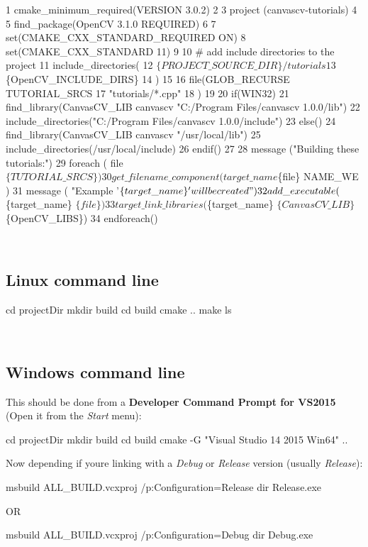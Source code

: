 \begin{DoxyCode}
1 cmake\_minimum\_required(VERSION 3.0.2)
2 
3 project (canvascv-tutorials)
4 
5 find\_package(OpenCV 3.1.0 REQUIRED)
6 
7 set(CMAKE\_CXX\_STANDARD\_REQUIRED ON)
8 set(CMAKE\_CXX\_STANDARD 11)
9 
10 # add include directories to the project
11 include\_directories(
12     $\{PROJECT\_SOURCE\_DIR\}/tutorials
13     $\{OpenCV\_INCLUDE\_DIRS\}
14 )
15 
16 file(GLOB\_RECURSE TUTORIAL\_SRCS
17     "tutorials/*.cpp"
18 )
19 
20 if(WIN32)
21     find\_library(CanvasCV\_LIB canvascv "C:/Program Files/canvascv 1.0.0/lib")
22     include\_directories("C:/Program Files/canvascv 1.0.0/include")
23 else()
24     find\_library(CanvasCV\_LIB canvascv "/usr/local/lib")
25     include\_directories(/usr/local/include)
26 endif()
27 
28 message ("Building these tutorials:")
29 foreach ( file $\{TUTORIAL\_SRCS\} )
30     get\_filename\_component( target\_name $\{file\} NAME\_WE )
31     message ( "Example '$\{target\_name\}' will be created")
32     add\_executable($\{target\_name\} $\{file\})
33     target\_link\_libraries ($\{target\_name\} $\{CanvasCV\_LIB\} $\{OpenCV\_LIBS\})
34 endforeach()
\end{DoxyCode}
 ~\newline
\hypertarget{cmake_cmakesec2}{}\subsection{Linux command line}\label{cmake_cmakesec2}
\begin{DoxyVerb}cd projectDir
mkdir build
cd build
cmake ..
make
ls
\end{DoxyVerb}
 ~\newline
\hypertarget{cmake_cmakesec3}{}\subsection{Windows command line}\label{cmake_cmakesec3}
This should be done from a {\bfseries Developer Command Prompt for V\+S2015} (Open it from the {\itshape Start} menu)\+: \begin{DoxyVerb}cd projectDir
mkdir build
cd build
cmake -G "Visual Studio 14 2015 Win64" ..
\end{DoxyVerb}


Now depending if you\textquotesingle{}re linking with a {\itshape Debug} or {\itshape Release} version (usually {\itshape Release})\+: \begin{DoxyVerb}msbuild ALL_BUILD.vcxproj /p:Configuration=Release
dir Release\*.exe
\end{DoxyVerb}


OR \begin{DoxyVerb}msbuild ALL_BUILD.vcxproj /p:Configuration=Debug
dir Debug\*.exe\end{DoxyVerb}
 